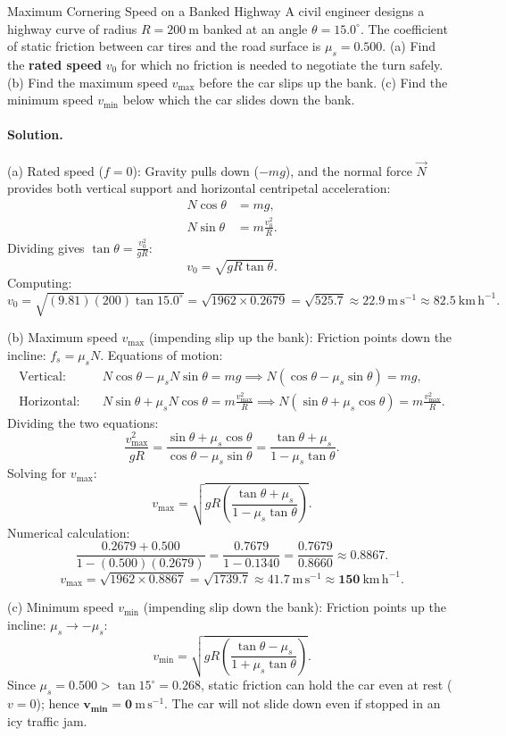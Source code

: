 \begin{workedexample}{Maximum Cornering Speed on a Banked Highway}
A civil engineer designs a highway curve of radius $R = 200\ \mathrm{m}$ banked at an angle $\theta = 15.0^\circ$. The coefficient of static friction between car tires and the road surface is $\mu_s = 0.500$.
(a) Find the \textbf{rated speed} $v_0$ for which no friction is needed to negotiate the turn safely.
(b) Find the maximum speed $v_{\max}$ before the car slips up the bank.
(c) Find the minimum speed $v_{\min}$ below which the car slides down the bank.

\paragraph{Solution.}

(a) Rated speed ($f = 0$):
Gravity pulls down ($-mg$), and the normal force $\vec{N}$ provides both vertical support and horizontal centripetal acceleration:
\begin{align*}
N\cos\theta &= mg, \\
N\sin\theta &= m\frac{v_0^2}{R}.
\end{align*}
Dividing gives $\tan\theta = \frac{v_0^2}{gR}$:
\[
\boxed{v_0 = \sqrt{gR\tan\theta}.}
\]
Computing:
\[
v_0 = \sqrt{(9.81)(200)\tan 15.0^\circ} = \sqrt{1962\times 0.2679} = \sqrt{525.7} \approx \mathbf{22.9\ \mathrm{m\,s^{-1}}} \approx 82.5\ \mathrm{km\,h^{-1}}.
\]

(b) Maximum speed $v_{\max}$ (impending slip up the bank):
Friction points down the incline: $f_s = \mu_s N$.
Equations of motion:
\begin{align*}
\text{Vertical:}\quad & N\cos\theta - \mu_s N\sin\theta = mg \implies N(\cos\theta - \mu_s\sin\theta) = mg, \\
\text{Horizontal:}\quad & N\sin\theta + \mu_s N\cos\theta = m\frac{v_{\max}^2}{R} \implies N(\sin\theta + \mu_s\cos\theta) = m\frac{v_{\max}^2}{R}.
\end{align*}
Dividing the two equations:
\[
\frac{v_{\max}^2}{gR} = \frac{\sin\theta + \mu_s\cos\theta}{\cos\theta - \mu_s\sin\theta} = \frac{\tan\theta + \mu_s}{1 - \mu_s\tan\theta}.
\]
Solving for $v_{\max}$:
\[
\boxed{v_{\max} = \sqrt{gR\left( \frac{\tan\theta + \mu_s}{1 - \mu_s\tan\theta} \right)}.}
\]
Numerical calculation:
\[
\frac{0.2679 + 0.500}{1 - (0.500)(0.2679)} = \frac{0.7679}{1 - 0.1340} = \frac{0.7679}{0.8660} \approx 0.8867.
\]
\[
v_{\max} = \sqrt{1962\times 0.8867} = \sqrt{1739.7} \approx \mathbf{41.7\ \mathrm{m\,s^{-1}}} \approx \mathbf{150\ \mathrm{km\,h^{-1}}.}
\]

(c) Minimum speed $v_{\min}$ (impending slip down the bank):
Friction points up the incline: $\mu_s \to -\mu_s$:
\[
\boxed{v_{\min} = \sqrt{gR\left( \frac{\tan\theta - \mu_s}{1 + \mu_s\tan\theta} \right)}.}
\]
Since $\mu_s = 0.500 > \tan 15^\circ = 0.268$, static friction can hold the car even at rest ($v = 0$); hence $\mathbf{v_{\min} = 0\ \mathrm{m\,s^{-1}}}$.
The car will not slide down even if stopped in an icy traffic jam.
\end{workedexample}
